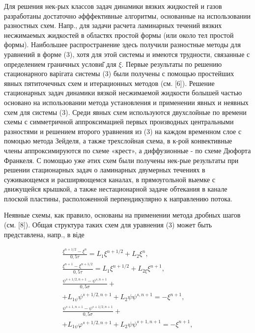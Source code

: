 \documentclass[10pt]{article}
\begin{document}
Для решения нек-рых классов задач динамики вязких жидкостей и газов разработаны достаточно әфффективные алгоритмы, основанные на использовании разностных схем. Напр., для задачи расчета ламинарных течений вязких несжимаемых жидкостей в областях простой формы (или около тел простой формы). Наибольшее распространение здесь получили разностные методы для уравнений в форме (3), хотя для этой системы и имеются трудности, связанные с определением граничных условиі̆ для $\xi$. Первые результаты по решению стационарного варігата системы (3) были получены с помощью простейших явных пятиточечных схем и итерационных методов (см. [6]). Решение стационарных задач динамики вязкой несжимаемой жидкости болышей частью основано на использовании метода установления и применении явных и неявных схем для системы (3). Среди явных схем используются двухслойные по времени схемы с симметричной аппроксимацией первых производных центральными разностями и решением второго уравнения из (3) на каждом временном слое с помоцью метода Зейделя, а также трехслойная схема, в к-рой конвективные члены аппроксимируются по схеме «крест», а диффузионные - по схеме Дюфорта Франкеля. С помощью уже әтих схем были получены нек-рые результаты при решении стационарных задач о ламинарных двумерных течениях в суживающемся и расширяющемся каналах, в прямоугольной выемке с движущейся крышкой, а также нестационарной задаче обтекания в канале плоской пластины, расположенной перпендикулярно к направлению потока.



Неявные схемы, как правило, основаны на применении метода дробных шагов (см. [8]). Общая структура таких схем для уравнения (3) может быть представлена, напр., в віде



\[

\begin{gathered}

\frac{\xi^{n+1 / 2}-\xi^{n}}{0,5 \tau}=L_{1} \xi^{n+1 / 2}+L_{2} \xi^{n}, \\

\frac{\xi^{n+1}-\xi^{n+1 / 2}}{0,5 \tau}=L_{1} \xi^{n+1 / 2}+L_{2 \xi} \xi^{n+1}, \\

\frac{\psi^{s+1 / 2, n+1}-\psi^{s, n+1}}{0,5 \sigma}+ \\

+L_{1 \psi} \psi^{s+1 / 2, n+1}+L_{2} \psi \psi^{s, n+1}=-\xi^{n+1}, \\

\frac{\psi^{s+1, n+1}-\psi^{s+1 / 2, n+1}}{0,5 \sigma}+ \\

+L_{1 \psi} \varphi^{s+1 / 2, n+1}+L_{2} \psi \psi^{s+1, n+1}=-\xi^{n+1},

\end{gathered}

\]
\end{document}
